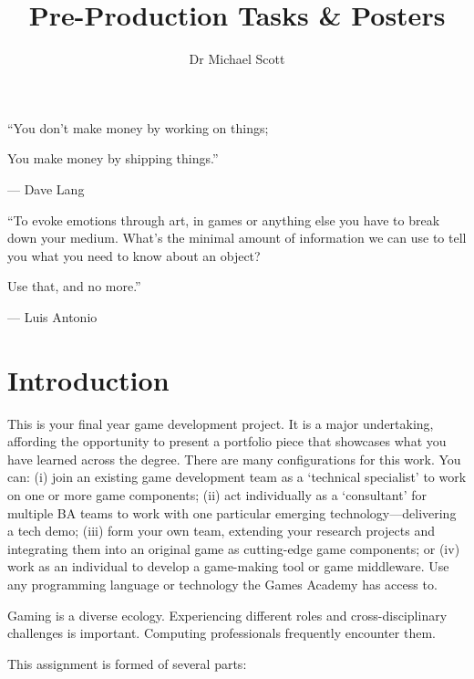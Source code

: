 \documentclass{../../fal_assignment}
\title{Pre-Production Tasks \& Posters}
\author{Dr Michael Scott}
\begin{document}
\maketitle

\begin{marginquote}
    ``You don't make money by working on things;
    
    You make money by shipping things.''
    
    --- Dave Lang
    
    \marginquoterule
    
    ``To evoke emotions through art,
in games or anything else
you have to break down your medium.
What's the minimal amount of information 
we can use to tell you
what you need to know about an object?

Use that, and no more.''
    
    --- Luis Antonio
\end{marginquote}

\section*{Introduction}

This is your final year game development project. It is a major undertaking, affording the opportunity to present a portfolio piece that showcases what you have learned across the degree. There are many configurations for this work. You can: (i) join an existing game development team as a `technical specialist' to work on one or more game components; (ii) act individually as a `consultant' for multiple BA teams to work with one particular emerging technology---delivering a tech demo; (iii) form your own team, extending your research projects and integrating them into an original game as cutting-edge game components; or (iv) work as an individual to develop a game-making tool or game middleware. Use any programming language or technology the Games Academy has access to.

Gaming is a diverse ecology. Experiencing different roles and cross-disciplinary challenges is important. Computing professionals frequently encounter them.

This assignment is formed of several parts:
\end{document}
